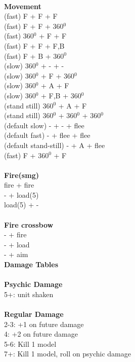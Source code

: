 \ \\ {\bf Movement } \\
(fast) F + F + F  \\
(fast) F + F + 360$^0$ \\
(fast) 360$^0$ + F + F \\
(fast) F + F + F,B \\
(fast) F + B + 360$^0$ \\
(slow) 360$^0$ + - + - \\
(slow) 360$^0$ + F + 360$^0$ \\
(slow) 360$^0$ + A + F \\
(slow) 360$^0$ + F,B + 360$^0$ \\
(stand still) 360$^0$ + A + F \\
(stand still) 360$^0$ + 360$^0$ + 360$^0$ \\
(default slow) - + - + flee \\
(default fast) - + flee + flee \\
(default stand-still) - + A + flee \\
(fast) F + 360$^0$ + F \\
\ \\ {\bf Fire(smg) } \\
fire + fire \\
- + load(5) \\
load(5) + - \\
\ \\ {\bf Fire crossbow } \\
- + fire \\
- + load \\
- + aim \\



{\bf Damage Tables} \\
\ \\ {\bf Psychic Damage } \\
5+: unit shaken \\
\ \\ {\bf Regular Damage } \\
2-3: +1 on future damage \\
4: +2 on future damage \\
5-6: Kill 1 model \\
7+: Kill 1 model, roll on psychic damage \\









